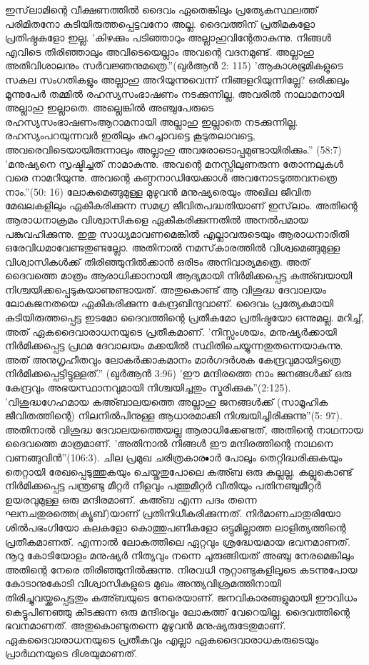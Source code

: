  ഇസ്‌ലാമിന്റെ വീക്ഷണത്തില്‍ ദൈവം ഏതെങ്കിലും പ്രത്യേകസ്ഥലത്ത് പരിമിതനോ കുടിയിരുത്തപ്പെട്ടവനോ അല്ല. ദൈവത്തിന് പ്രതിമകളോ പ്രതിഷ്ഠകളോ ഇല്ല.
'കിഴക്കും പടിഞ്ഞാറും അല്ലാഹുവിന്റേതാകുന്നു. നിങ്ങള്‍ എവിടെ തിരിഞ്ഞാലും അവിടെയെല്ലാം അവന്റെ വദനമുണ്ട്. അല്ലാഹു അതിവിശാലനും സര്‍വജ്ഞനുമത്രെ.''(ഖുര്‍ആന്‍ 2: 115)
'ആകാശഭൂമികളുടെ സകല സംഗതികളും അല്ലാഹു അറിയുന്നുവെന്ന് നിങ്ങളറിയുന്നില്ലേ? ഒരിക്കലും മൂന്നുപേര്‍ തമ്മില്‍ രഹസ്യസംഭാഷണം നടക്കുന്നില്ല, അവരില്‍ നാലാമനായി അല്ലാഹു ഇല്ലാതെ. അല്ലെങ്കില്‍ അഞ്ചുപേരുടെ രഹസ്യസംഭാഷണംആറാമനായി അല്ലാഹു ഇല്ലാതെ നടക്കുന്നില്ല. രഹസ്യംപറയുന്നവര്‍ ഇതിലും കുറച്ചാവട്ടെ കൂടുതലാവട്ടെ, അവരെവിടെയായിരുന്നാലും അല്ലാഹു അവരോടൊപ്പമുണ്ടായിരിക്കും.'' (58:7)
'മനുഷ്യനെ സൃഷ്ടിച്ചത് നാമാകുന്നു. അവന്റെ മനസ്സിലുണരുന്ന തോന്നലുകള്‍ വരെ നാമറിയുന്നു. അവന്റെ കണ്ഠനാഡിയേക്കാള്‍ അവനോടടുത്തവനത്രെ നാം.''(50: 16)
ലോകമെങ്ങുമുള്ള മുഴുവന്‍ മനുഷ്യരെയും അഖില ജീവിത മേഖലകളിലും ഏകീകരിക്കുന്ന സമഗ്ര ജീവിതപദ്ധതിയാണ് ഇസ്‌ലാം. അതിന്റെ ആരാധനാക്രമം വിശ്വാസികളെ ഏകീകരിക്കുന്നതില്‍ അനല്‍പമായ പങ്കുവഹിക്കുന്നു. ഇതു സാധ്യമാവണമെങ്കില്‍ എല്ലാവരുടെയും ആരാധനാരീതി ഒരേവിധമാവേണ്ടതുണ്ടല്ലോ. അതിനാല്‍ നമസ്‌കാരത്തില്‍ വിശ്വമെങ്ങുമുള്ള വിശ്വാസികള്‍ക്ക് തിരിഞ്ഞുനില്‍ക്കാന്‍ ഒരിടം അനിവാര്യമത്രെ. അത് ദൈവത്തെ മാത്രം ആരാധിക്കാനായി ആദ്യമായി നിര്‍മിക്കപ്പെട്ട കഅ്ബയായി നിശ്ചയിക്കപ്പെടുകയാണുണ്ടായത്. അതുകൊണ്ട് ആ വിശുദ്ധ ദേവാലയം ലോകജനതയെ ഏകീകരിക്കുന്ന കേന്ദ്രബിന്ദുവാണ്. ദൈവം പ്രത്യേകമായി കുടിയിരുത്തപ്പെട്ട ഇടമോ ദൈവത്തിന്റെ പ്രതീകമോ പ്രതിഷ്ഠയോ ഒന്നുമല്ല. മറിച്ച്, അത് ഏകദൈവാരാധനയുടെ പ്രതീകമാണ്.
'നിസ്സംശയം, മനുഷ്യര്‍ക്കായി നിര്‍മിക്കപ്പെട്ട പ്രഥമ ദേവാലയം മക്കയില്‍ സ്ഥിതിചെയ്യുന്നതുതന്നെയാകുന്നു. അത് അനുഗൃഹീതവും ലോകര്‍ക്കാകമാനം മാര്‍ഗദര്‍ശക കേന്ദ്രവുമായിട്ടത്രെ നിര്‍മിക്കപ്പെട്ടിട്ടുള്ളത്.'' (ഖുര്‍ആന്‍ 3:96)
'ഈ മന്ദിരത്തെ നാം ജനങ്ങള്‍ക്ക് ഒരു കേന്ദ്രവും അഭയസ്ഥാനവുമായി നിശ്ചയിച്ചതും സ്മരിക്കുക''(2:125). 'വിശുദ്ധഗേഹമായ കഅ്ബാലയത്തെ അല്ലാഹു ജനങ്ങള്‍ക്ക് (സാമൂഹിക ജീവിതത്തിന്റെ) നിലനില്‍പിനുള്ള ആധാരമാക്കി നിശ്ചയിച്ചിരിക്കുന്നു''(5: 97).
അതിനാല്‍ വിശുദ്ധ ദേവാലയത്തെയല്ല ആരാധിക്കേണ്ടത്, അതിന്റെ നാഥനായ ദൈവത്തെ മാത്രമാണ്. 'അതിനാല്‍ നിങ്ങള്‍ ഈ മന്ദിരത്തിന്റെ നാഥനെ വണങ്ങുവിന്‍''(106:3).
ചില പ്രമുഖ ചരിത്രകാര•ാര്‍ പോലും തെറ്റിദ്ധരിക്കുകയും തെറ്റായി രേഖപ്പെടുത്തുകയും ചെയ്തതുപോലെ കഅ്ബ ഒരു കല്ലല്ല. കല്ലുകൊണ്ട് നിര്‍മിക്കപ്പെട്ട പന്ത്രണ്ടു മീറ്റര്‍ നീളവും പത്തുമീറ്റര്‍ വീതിയും പതിനഞ്ചുമീറ്റര്‍ ഉയരവുമുള്ള ഒരു മന്ദിരമാണ്. കഅ്ബ എന്ന പദം തന്നെ ഘനചതുരത്തെ(ക്യൂബ്)യാണ് പ്രതിനിധീകരിക്കുന്നത്. നിര്‍മാണചാതുരിയോ ശില്‍പഭംഗിയോ കലകളോ കൊത്തുപണികളോ ഒട്ടുമില്ലാത്ത ലാളിത്യത്തിന്റെ പ്രതീകമാണത്.
എന്നാല്‍ ലോകത്തിലെ ഏറ്റവും ശ്രദ്ധേയമായ ഭവനമാണത്. നൂറു കോടിയോളം മനുഷ്യര്‍ നിത്യവും നന്നെ ചുരുങ്ങിയത് അഞ്ചു നേരമെങ്കിലും അതിന്റെ നേരെ തിരിഞ്ഞുനില്‍ക്കുന്നു. നിരവധി നൂറ്റാണ്ടുകളിലൂടെ കടന്നുപോയ കോടാനുകോടി വിശ്വാസികളുടെ മുഖം അന്ത്യവിശ്രമത്തിനായി തിരിച്ചുവയ്ക്കപ്പെട്ടതും കഅ്ബയുടെ നേരെയാണ്. ജനവികാരങ്ങളുമായി ഈവിധം കെട്ടുപിണഞ്ഞു കിടക്കുന്ന ഒരു മന്ദിരവും ലോകത്ത് വേറെയില്ല. ദൈവത്തിന്റെ ഭവനമാണത്. അതുകൊണ്ടുതന്നെ മുഴുവന്‍ മനുഷ്യരുടേതുമാണ്. ഏകദൈവാരാധനയുടെ പ്രതീകവും എല്ലാ ഏകദൈവാരാധകരുടെയും പ്രാര്‍ഥനയുടെ ദിശയുമാണത്.

